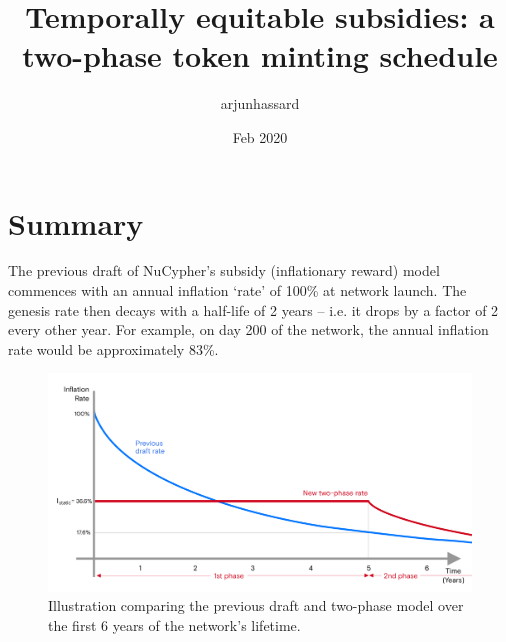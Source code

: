 \documentclass[8pt]{article}
\title{Temporally equitable subsidies: a two-phase token minting schedule}
\author{arjunhassard}
\date{Feb 2020}
\begin{document}
\maketitle


\section{Summary}

The previous draft of NuCypher's subsidy (inflationary reward) model commences with an annual inflation `rate' of 100\% at network launch. The genesis rate then decays with a half-life of 2 years – i.e. it drops by a factor of 2 every other year. For example, on day 200 of the network, the annual inflation rate would be approximately 83\%.

\begin{figure}[h!]
    \includegraphics[width=\textwidth]{Two_phase_inflation.png}
    \caption{Illustration comparing the previous draft and two-phase model over the first 6 years of the network's lifetime.}
    \label{fig:tp}
\end{figure}
\end{document}
